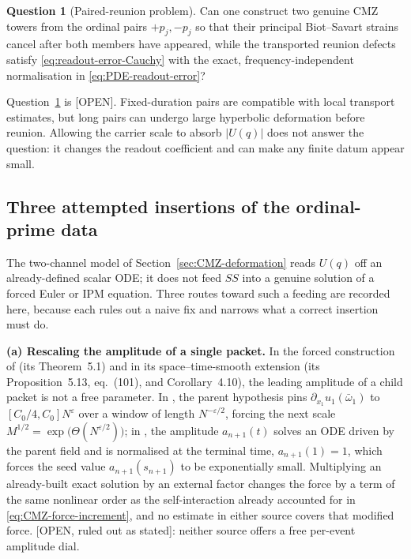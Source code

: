 \documentclass[11pt]{amsart}
\numberwithin{equation}{section}
\theoremstyle{plain}
\theoremstyle{definition}
\newtheorem{question}[theorem]{Question}
\theoremstyle{remark}
\begin{document}
\begin{question}[Paired-reunion problem]
\label{q:paired-reunion}
Can one construct two genuine CMZ towers from the ordinal pairs
$+p_j,-p_j$ so that their principal Biot--Savart strains cancel after both
members have appeared, while the transported reunion defects satisfy
\eqref{eq:readout-error-Cauchy} with the exact, frequency-independent
normalisation in \eqref{eq:PDE-readout-error}?
\end{question}

Question~\ref{q:paired-reunion} is \textup{[OPEN]}.  Fixed-duration pairs are
compatible with local transport estimates, but long pairs can undergo large
hyperbolic deformation before reunion.  Allowing the carrier scale to absorb
$|U(q)|$ does not answer the question: it changes the readout coefficient and
can make any finite datum appear small.

\subsection{Three attempted insertions of the ordinal-prime data}
\label{subsec:three-attempts}

The two-channel model of Section~\ref{sec:CMZ-deformation} reads $U(q)$ off
an already-defined scalar ODE; it does not feed $SS$ into a genuine solution
of a forced Euler or IPM equation.  Three routes toward such a feeding are
recorded here, because each rules out a naive fix and narrows what a correct
insertion must do.

\textbf{(a) Rescaling the amplitude of a single packet.}  In the forced
construction of \cite{CordobaMartinezZoroa2023} (its Theorem~5.1) and in its
space--time-smooth extension \cite{AlpogeBuckmasterCoiculescu2026} (its
Proposition~5.13, eq.~(101), and Corollary~4.10), the leading amplitude of a
child packet is not a free parameter.  In \cite{CordobaMartinezZoroa2023},
the parent hypothesis pins $\partial_{x_1}u_1(\bar\omega_1)$ to
$[C_0/4,C_0]N^\varepsilon$ over a window of length $N^{-\varepsilon/2}$,
forcing the next scale $M^{1/2}=\exp\big(\Theta(N^{\varepsilon/2})\big)$; in
\cite{AlpogeBuckmasterCoiculescu2026}, the amplitude $a_{n+1}(t)$ solves an
ODE driven by the parent field and is normalised at the terminal time,
$a_{n+1}(1)=1$, which forces the seed value $a_{n+1}(s_{n+1})$ to be
exponentially small.  Multiplying an already-built exact solution by an
external factor changes the force by a term of the same nonlinear order as
the self-interaction already accounted for in \eqref{eq:CMZ-force-increment},
and no estimate in either source covers that modified force.
\textup{[OPEN, ruled out as stated]}: neither source offers a free per-event
amplitude dial.
\end{document}
